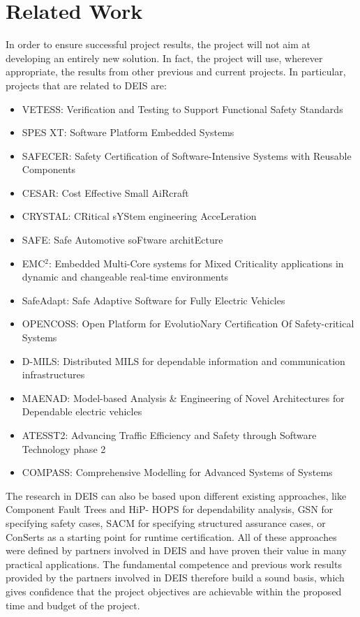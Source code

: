 \section{Related Work}
In order to ensure successful project results, the project will not aim at developing an entirely new solution. In fact, the project will use, wherever appropriate, the results from other previous and current projects. In particular, projects that are related to DEIS are: 
\begin{itemize}
	\item VETESS: Verification and Testing to Support Functional Safety Standards
	\item SPES XT: Software Platform Embedded Systems
	\item SAFECER: Safety Certification of Software-Intensive Systems with Reusable Components
	\item CESAR: Cost Effective Small AiRcraft
	\item CRYSTAL: CRitical sYStem engineering AcceLeration
	\item SAFE: Safe Automotive soFtware architEcture
	\item EMC$^2$: Embedded Multi-Core systems for Mixed Criticality applications in dynamic and changeable real-time environments
	\item SafeAdapt: Safe Adaptive Software for Fully Electric Vehicles
	\item OPENCOSS: Open Platform for EvolutioNary Certification Of Safety-critical Systems 
	\item D-MILS: Distributed MILS for dependable information and communication infrastructures
	\item MAENAD: Model-based Analysis \& Engineering of Novel Architectures for Dependable electric vehicles
	\item ATESST2: Advancing Traffic Efficiency and Safety through Software Technology phase 2
	\item COMPASS: Comprehensive Modelling for Advanced Systems of Systems
\end{itemize}

The research in DEIS can also be based upon different existing approaches, like Component Fault Trees \cite{Kaiser2003} and HiP- HOPS \cite{Papadopoulos1999} for dependability analysis, GSN \cite{kelly2004goal} for specifying safety cases, SACM \cite{sacm2} for specifying structured assurance cases,  or ConSerts \cite{Schneider2003} as a starting point for runtime certification. All of these approaches were defined by partners involved in DEIS and have proven their value in many practical applications. The fundamental competence and previous work results provided by the partners involved in DEIS therefore build a sound basis, which gives confidence that the project objectives are achievable within the proposed time and budget of the project.